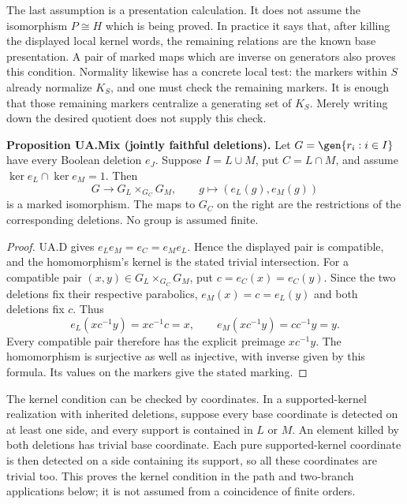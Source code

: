 The last assumption is a presentation calculation. It does not assume the
isomorphism $P\cong H$ which is being proved. In practice it says that, after
killing the displayed local kernel words, the remaining relations are the
known base presentation. A pair of marked maps which are inverse on generators
also proves this condition. Normality likewise has a concrete local test: the
markers within $S$ already normalize $K_S$, and one must check the remaining
markers. It is enough that those remaining markers centralize a generating
set of $K_S$. Merely writing down the desired quotient does not supply this
check.


\textbf{Proposition UA.Mix (jointly faithful deletions).}
Let $G=\gen{r_i:i\in I}$ have every Boolean deletion $e_J$. Suppose
$I=L\cup M$, put $C=L\cap M$, and assume
$\ker e_L\cap\ker e_M=1$. Then
\[
 G\longrightarrow G_L\times_{G_C}G_M,\qquad
 g\longmapsto(e_L(g),e_M(g))
\]
is a marked isomorphism. The maps to $G_C$ on the right are the restrictions
of the corresponding deletions. No group is assumed finite.
\begin{proof}
UA.D gives $e_Le_M=e_C=e_Me_L$. Hence the displayed pair is compatible,
and the homomorphism's kernel is the stated trivial intersection.
For a compatible pair $(x,y)\in G_L\times_{G_C}G_M$, put
$c=e_C(x)=e_C(y)$. Since the two deletions fix their respective
parabolics, $e_M(x)=c=e_L(y)$ and both deletions fix $c$. Thus
\[
 e_L(xc^{-1}y)=xc^{-1}c=x,\qquad
 e_M(xc^{-1}y)=cc^{-1}y=y.
\]
Every compatible pair therefore has the explicit preimage $xc^{-1}y$.
The homomorphism is surjective as well as injective, with inverse given
by this formula. Its values on the markers give the stated marking.
\end{proof}

The kernel condition can be checked by coordinates. In a supported-kernel
realization with inherited deletions, suppose every base coordinate is
detected on at least one side, and every support is contained in $L$ or
$M$. An element killed by both deletions has trivial base coordinate. Each
pure supported-kernel coordinate is then detected on a side containing its
support, so all these coordinates are trivial too. This proves the kernel
condition in the path and two-branch applications below; it is not assumed
from a coincidence of finite orders.
